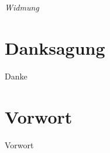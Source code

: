 \documentclass[11pt]{book}
\begin{document}
\pagestyle{empty}
\frontmatter

\chapter*{}
\begin{flushright}
\textit{Widmung}
\end{flushright}



\chapter*{Danksagung}

Danke



\chapter*{Vorwort}

\pagestyle{plain}

Vorwort



\tableofcontents


\mainmatter %
\pagestyle{headings}


\thispagestyle{empty}





\thispagestyle{empty}

\thispagestyle{empty}

\thispagestyle{empty}

\thispagestyle{empty}

\thispagestyle{empty}
\end{document}
